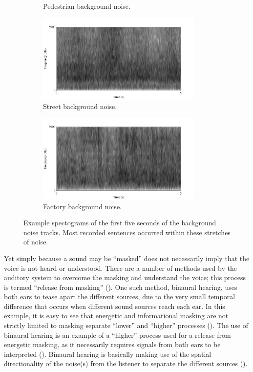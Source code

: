 \documentclass[dissertation,copyright]{uathesis}
\begin{document}
\begin{figure}
\begin{subfigure}{0.5\textwidth}
  \caption{Pedestrian background noise.}
  \label{fig:ped-bkgrnd}
\end{subfigure}
\begin{subfigure}{0.5\textwidth}
  \centering
  \includegraphics[width=0.9\textwidth]{figure/spctgrm-str-background.png}
  \caption{Street background noise.}
  \label{fig:str-bkgrnd}
\end{subfigure}%
\hfill
\begin{subfigure}{0.5\textwidth}
  \centering
  \includegraphics[width=0.9\textwidth]{figure/spctgrm-fac-background.png}
  \caption{Factory background noise.}
  \label{fig:fac-bkgrnd}
\end{subfigure}
\caption{Example spectograms of the first five seconds of the background noise tracks. Most recorded sentences occurred within these stretches of noise.}
\label{fig:bkgrnd-noises}
\end{figure}

Yet simply because a sound may be ``masked'' does not necessarily imply that the voice is not heard or understood.  There are a number of methods used by the auditory system to overcome the masking and understand the voice; this process is termed ``release from masking'' (\cite{middlebrooks:17}).  One such method, binaural hearing, uses both ears to tease apart the different sources, due to the very small temporal difference that occurs when different sound sources reach each ear.  
In this example, it is easy to see that energetic and informational masking are not strictly limited to masking separate ``lower'' and ``higher'' processes (\cite{durlach:06}).
The use of binaural hearing is an example of a ``higher'' process used for a release from energetic masking, as it necessarily requires signals from both ears to be interpreted (\cite{hirsh:47}). Binaural hearing is basically making use of the spatial directionality of the noise(s) from the listener to separate the different sources (\cite{bregman:94}).
\end{document}
